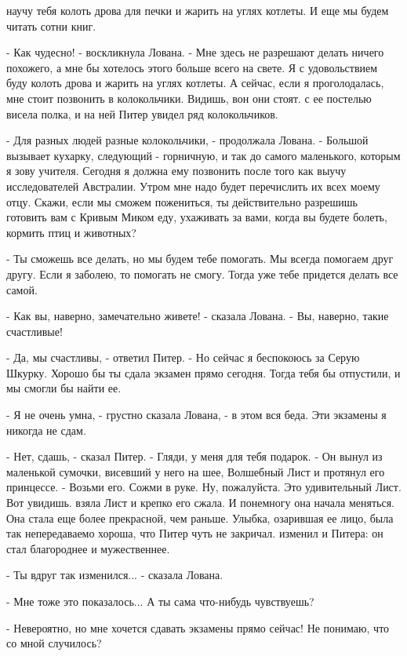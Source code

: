 научу тебя колоть дрова для печки и жарить на углях котлеты. И еще мы 
будем читать сотни книг.
\par- Как чудесно! - воскликнула Лована. - Мне здесь не разрешают 
делать ничего похожего, а мне бы хотелось этого больше всего на свете. 
Я с удовольствием буду колоть дрова и жарить на углях котлеты. А 
сейчас, если я проголодалась, мне стоит позвонить в колокольчики. 
Видишь, вон они стоят.
 с ее постелью висела полка, и на ней Питер увидел ряд 
колокольчиков.
\par- Для разных людей разные колокольчики, - продолжала Лована. - 
Большой вызывает кухарку, следующий - горничную, и так до самого 
маленького, которым я зову учителя. Сегодня я должна ему позвонить 
после того как выучу исследователей Австралии. Утром мне надо будет 
перечислить их всех моему отцу. Скажи, если мы сможем пожениться, ты 
действительно разрешишь готовить вам с Кривым Миком еду, ухаживать за 
вами, когда вы будете болеть, кормить птиц и животных?
\par- Ты сможешь все делать, но мы будем тебе помогать. Мы всегда 
помогаем друг другу. Если я заболею, то помогать не смогу. Тогда уже 
тебе придется делать все самой.
\par- Как вы, наверно, замечательно живете! - сказала Лована. - Вы, 
наверно, такие счастливые!
\par- Да, мы счастливы, - ответил Питер. - Но сейчас я беспокоюсь за 
Серую Шкурку. Хорошо бы ты сдала экзамен прямо сегодня. Тогда тебя бы 
отпустили, и мы смогли бы найти ее.
\par- Я не очень умна, - грустно сказала Лована, - в этом вся беда. 
Эти экзамены я никогда не сдам.
\par- Нет, сдашь, - сказал Питер. - Гляди, у меня для тебя подарок. - 
Он вынул из маленькой сумочки, висевший у него на шее, Волшебный Лист 
и протянул его принцессе. - Возьми его. Сожми в руке. Ну, пожалуйста. 
Это удивительный Лист. Вот увидишь.
 взяла Лист и крепко его сжала. И понемногу она начала 
меняться. Она стала еще более прекрасной, чем раньше. Улыбка, 
озарившая ее лицо, была так непередаваемо хороша, что Питер чуть не 
закричал.
 изменил и Питера: он стал благороднее и мужественнее.
\par- Ты вдруг так изменился... - сказала Лована.
\par- Мне тоже это показалось... А ты сама что-нибудь чувствуешь?
\par- Невероятно, но мне хочется сдавать экзамены прямо сейчас! Не 
понимаю, что со мной случилось?
